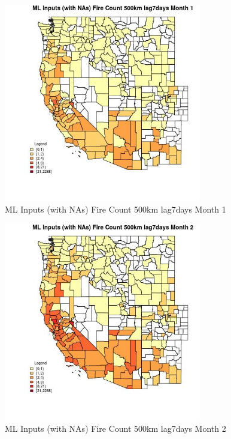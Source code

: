 \begin{figure} 
\centering  
\includegraphics[width=0.77\textwidth]{Code_Outputs/Report_ML_input_PM25_Step4_part_e_de_duplicated_aves_compiled_2019-05-21wNAs_CountyFire_Count_500km_lag7daysmedianMonth1.jpg} 
\caption{\label{fig:Report_ML_input_PM25_Step4_part_e_de_duplicated_aves_compiled_2019-05-21wNAsCountyFire_Count_500km_lag7daysmedianMonth1}ML Inputs (with NAs) Fire Count 500km lag7days Month 1} 
\end{figure} 
 

\begin{figure} 
\centering  
\includegraphics[width=0.77\textwidth]{Code_Outputs/Report_ML_input_PM25_Step4_part_e_de_duplicated_aves_compiled_2019-05-21wNAs_CountyFire_Count_500km_lag7daysmedianMonth2.jpg} 
\caption{\label{fig:Report_ML_input_PM25_Step4_part_e_de_duplicated_aves_compiled_2019-05-21wNAsCountyFire_Count_500km_lag7daysmedianMonth2}ML Inputs (with NAs) Fire Count 500km lag7days Month 2} 
\end{figure} 
 

